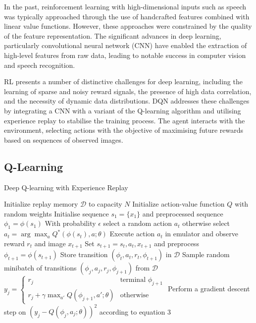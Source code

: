 \documentclass[twocolumn]{webofc}
\begin{document}
In the past, reinforcement learning with high-dimensional inputs such as speech was typically approached through the use of handcrafted features combined with linear value functions. However, these approaches were constrained by the quality of the feature representation. The significant advances in deep learning, particularly convolutional neural network (CNN) have enabled the extraction of high-level features from raw data, leading to notable success in computer vision and speech recognition. \cite{mnih2013playingatarideepreinforcement}

RL presents a number of distinctive challenges for deep learning, including the learning of sparse and noisy reward signals, the presence of high data correlation, and the necessity of dynamic data distributions. DQN addresses these challenges by integrating a CNN with a variant of the Q-learning algorithm and utilising experience replay to stabilise the training process. The agent interacts with the environment, selecting actions with the objective of maximising future rewards based on sequences of observed images. \cite{mnih2013playingatarideepreinforcement}

\subsection{Q-Learning}

\begin{algorithm}[H]
\caption{Deep Q-learning with Experience Replay}
\begin{algorithmic}[1]
\State Initialize replay memory $\mathcal{D}$ to capacity $N$
\State Initialize action-value function $Q$ with random weights
    \State Initialise sequence $s_1 = \{ x_1 \}$ and preprocessed \Statex \quad \quad sequence $\phi_1 = \phi(s_1)$
        \State With probability $\epsilon$ select a random action $a_t$
        \State otherwise select $a_t = \arg\max_a Q^*(\phi(s_t), a; \theta)$
        \State Execute action $a_t$ in emulator and observe \Statex \quad \quad \quad reward $r_t$ and image $x_{t+1}$
        \State Set $s_{t+1} = s_t, a_t, x_{t+1}$ and \Statex \quad \quad \quad preprocess $\phi_{t+1} = \phi(s_{t+1})$
        \State Store transition $(\phi_t, a_t, r_t, \phi_{t+1})$ in $\mathcal{D}$
        \State Sample random minibatch of transitions \Statex \qquad \quad $(\phi_j, a_j, r_j, \phi_{j+1})$ from $\mathcal{D}$
        \State $y_j = \begin{cases} 
        r_j & \text{terminal } \phi_{j+1} \\
        r_j + \gamma \max_{a'} Q(\phi_{j+1}, a'; \theta) & \text{otherwise}
        \end{cases}$
        \State Perform a gradient descent step on \Statex \qquad \quad $(y_j - Q(\phi_j, a_j; \theta))^2$ according to equation 3
    \EndFor
\EndFor
\end{algorithmic}
\end{algorithm}
\end{document}
